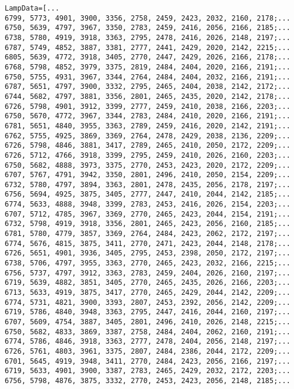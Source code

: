 \begin{verbatim}
LampData=[...
6799, 5773, 4901, 3900, 3356, 2758, 2459, 2423, 2032, 2160, 2178;...
6750, 5639, 4797, 3967, 3350, 2783, 2459, 2416, 2056, 2166, 2185;...
6738, 5780, 4919, 3918, 3363, 2795, 2478, 2416, 2026, 2148, 2197;...
6787, 5749, 4852, 3887, 3381, 2777, 2441, 2429, 2020, 2142, 2215;...
6805, 5639, 4772, 3918, 3405, 2770, 2447, 2429, 2026, 2166, 2178;...
6768, 5798, 4852, 3979, 3375, 2819, 2484, 2404, 2020, 2166, 2191;...
6750, 5755, 4931, 3967, 3344, 2764, 2484, 2404, 2032, 2166, 2191;...
6787, 5651, 4797, 3900, 3332, 2795, 2465, 2404, 2038, 2142, 2172;...
6744, 5682, 4797, 3881, 3356, 2801, 2465, 2435, 2020, 2142, 2178;...
6726, 5798, 4901, 3912, 3399, 2777, 2459, 2410, 2038, 2166, 2203;...
6750, 5670, 4772, 3967, 3344, 2783, 2484, 2410, 2020, 2166, 2191;...
6781, 5651, 4840, 3955, 3363, 2789, 2459, 2416, 2020, 2142, 2191;...
6762, 5755, 4925, 3869, 3369, 2764, 2478, 2429, 2038, 2136, 2209;...
6726, 5798, 4846, 3881, 3417, 2789, 2465, 2410, 2050, 2172, 2209;...
6726, 5712, 4766, 3918, 3399, 2795, 2459, 2410, 2026, 2160, 2203;...
6750, 5682, 4888, 3973, 3375, 2770, 2453, 2423, 2020, 2172, 2209;...
6707, 5767, 4791, 3942, 3350, 2801, 2496, 2410, 2050, 2154, 2209;...
6732, 5780, 4797, 3894, 3363, 2801, 2478, 2435, 2056, 2178, 2197;...
6756, 5694, 4925, 3875, 3405, 2777, 2447, 2410, 2044, 2142, 2185;...
6774, 5633, 4888, 3948, 3399, 2783, 2453, 2416, 2026, 2154, 2203;...
6707, 5712, 4785, 3967, 3369, 2770, 2465, 2423, 2044, 2154, 2191;...
6732, 5798, 4919, 3918, 3356, 2801, 2465, 2423, 2056, 2160, 2185;...
6781, 5780, 4779, 3857, 3369, 2764, 2484, 2423, 2062, 2172, 2197;...
6774, 5676, 4815, 3875, 3411, 2770, 2471, 2423, 2044, 2148, 2178;...
6726, 5651, 4901, 3936, 3405, 2795, 2453, 2398, 2050, 2172, 2197;...
6738, 5706, 4797, 3955, 3363, 2770, 2465, 2423, 2032, 2166, 2215;...
6756, 5737, 4797, 3912, 3363, 2783, 2459, 2404, 2026, 2160, 2197;...
6719, 5639, 4882, 3851, 3405, 2770, 2465, 2435, 2026, 2166, 2203;...
6713, 5633, 4919, 3875, 3417, 2770, 2465, 2429, 2044, 2142, 2209;...
6774, 5731, 4821, 3900, 3393, 2807, 2453, 2392, 2056, 2142, 2209;...
6719, 5786, 4840, 3948, 3363, 2795, 2447, 2416, 2044, 2160, 2197;...
6707, 5609, 4754, 3887, 3405, 2801, 2496, 2410, 2026, 2148, 2215;...
6750, 5682, 4833, 3869, 3387, 2758, 2484, 2404, 2062, 2160, 2191;...
6774, 5786, 4846, 3918, 3363, 2777, 2478, 2404, 2056, 2148, 2197;...
6726, 5761, 4803, 3961, 3375, 2807, 2484, 2386, 2044, 2172, 2209;...
6701, 5645, 4919, 3948, 3411, 2770, 2484, 2423, 2056, 2166, 2197;...
6719, 5633, 4901, 3900, 3387, 2783, 2465, 2429, 2032, 2172, 2203;...
6756, 5798, 4876, 3875, 3332, 2770, 2453, 2423, 2056, 2148, 2185;...

\end{verbatim}
